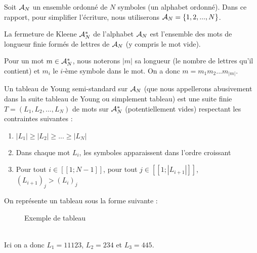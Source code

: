 Soit $\mathcal{A}_N$ un ensemble ordonné de $N$ symboles (un alphabet ordonné). Dans ce rapport, pour simplifier l'écriture, nous utiliserons $\mathcal{A}_N = \{1,2,...,N\}$.
\begin{definition}
  La fermeture de Kleene $\mathcal{A}_N^*$ de l'alphabet $\mathcal{A}_N$ est l'ensemble des mots de longueur finie formés de lettres de $\mathcal{A}_N$ (y compris le mot vide).
\end{definition}

Pour un mot $m \in \mathcal{A}_N^*$, nous noterons $|m|$ sa longueur (le nombre de lettres qu'il contient) et $m_i$ le $i$-ème symbole dans le mot. On a donc $m=m_1m_2...m_{|m|}$.

\begin{definition}[tableau] \label{def:tab}
  Un tableau de Young semi-standard sur $\mathcal{A}_N$ (que nous appellerons abusivement dans la suite tableau de Young ou simplement tableau) est une suite finie $T=(L_1,L_2,...,L_N)$ de mots sur $\mathcal{A}_N^*$ (potentiellement vides) respectant les contraintes suivantes : 
  \begin{enumerate}
    \item $|L_1| \geq |L_2| \geq ... \geq |L_N|$
    \item Dans chaque mot $L_i$, les symboles apparaissent dans l'ordre croissant
    \item Pour tout $i \in [\![1;N-1]\!]$, pour tout $j \in [\![1;|L_{i+1}|]\!]$, $(L_{i+1})_j > (L_i)_j$
  \end{enumerate}
\end{definition}

On représente un tableau sous la forme suivante : \\
\begin{figure}[!ht]
  \centering
  \caption{Exemple de tableau}
  \label{fig:tab1}
\end{figure}
\\
\vspace*{-2em} \noindent Ici on a donc $L_1=11123$, $L_2=234$ et $L_3=445$.

